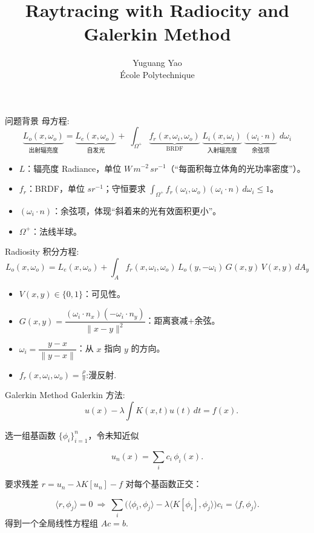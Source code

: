 \documentclass[10pt,aspectratio=169]{beamer}
\title[短标题]{Raytracing with Radiocity and Galerkin Method}
\author[Your Name]{Yuguang Yao\\\small École Polytechnique}
\begin{document}
\begin{frame}[plain]
  \titlepage
\end{frame}


\begin{frame}{问题背景}
    母方程:
$$
\underbrace{L_o(x,\omega_o)}_{\text{出射辐亮度}}
=
\underbrace{L_e(x,\omega_o)}_{\text{自发光}}
+\;
\int_{\Omega^+}
\underbrace{f_r(x,\omega_i,\omega_o)}_{\text{BRDF}}
\;
\underbrace{L_i(x,\omega_i)}_{\text{入射辐亮度}}
\;
\underbrace{(\omega_i\!\cdot\!n)}_{\text{余弦项}}
\;d\omega_i
$$

\begin{itemize}
    \item $L$：辐亮度 Radiance，单位 $W\,m^{-2}\,sr^{-1}$（“每面积每立体角的光功率密度”）。
    \item $f_r$：BRDF，单位 $sr^{-1}$；守恒要求 $\int_{\Omega^+} f_r(\omega_i,\omega_o)(\omega_i\!\cdot\!n)\,d\omega_i \le 1$。
    \item $(\omega_i\!\cdot\!n)$：余弦项，体现“斜着来的光有效面积更小”。
    \item $\Omega^+$：法线半球。
\end{itemize}
\end{frame}



\begin{frame}{Radiosity}
    积分方程:
$$
L_o(x,\omega_o)=L_e(x,\omega_o)
+\int_{A} f_r(x,\omega_i,\omega_o)\,L_o(y,-\omega_i)\,G(x,y)\,V(x,y)\,dA_y
$$

\begin{itemize}
    \item $V(x,y)\in\{0,1\}$：可见性。
    \item $G(x,y)=\dfrac{(\omega_i\!\cdot\!n_x)(-\omega_i\!\cdot\!n_y)}{\|x-y\|^2}$：距离衰减+余弦。
    \item $\omega_i=\dfrac{y-x}{\|y-x\|}$：从 $x$ 指向 $y$ 的方向。
    \item $f_r(x,\omega_i,\omega_o)=\frac{\rho}{\pi}$:漫反射.
\end{itemize}
\end{frame}

\begin{frame}{Galerkin Method}
   Galerkin 方法:
  $$
  \quad u(x)-\lambda\!\int K(x,t)u(t)\,dt=f(x).
  $$

  选一组基函数 $\{\phi_i\}_{i=1}^n$，令未知近似

  $$
  u_n(x)=\sum_i c_i\,\phi_i(x).
  $$

  要求残差 $r=u_n-\lambda K[u_n]-f$ 对每个基函数正交：

  $$
  \langle r,\phi_j\rangle = 0\ \Rightarrow\ 
  \sum_i \big(\langle \phi_i,\phi_j\rangle -\lambda\langle K[\phi_i],\phi_j\rangle\big)c_i = \langle f,\phi_j\rangle.
  $$
  得到一个全局线性方程组 $A c = b$.

\end{frame}
\end{document}
